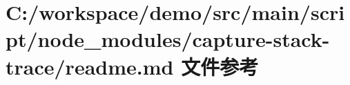 \hypertarget{node__modules_2capture-stack-trace_2_r_e_a_d_m_e_8md}{}\section{C\+:/workspace/demo/src/main/script/node\+\_\+modules/capture-\/stack-\/trace/readme.md 文件参考}
\label{node__modules_2capture-stack-trace_2_r_e_a_d_m_e_8md}
